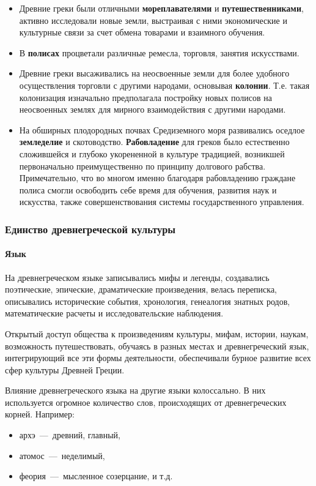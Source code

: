 \begin{itemize}
    \item Древние греки были отличными \textbf{мореплавателями} и \textbf{путешественниками}, активно исследовали новые земли, выстраивая с ними экономические и культурные связи за счет обмена товарами и взаимного обучения.
    \item В \textbf{полисах} процветали различные ремесла, торговля, занятия искусствами.
    \item Древние греки высаживались на неосвоенные земли для более удобного осуществления торговли с другими народами, основывая \textbf{колонии}. Т.е. такая колонизация изначально предполагала постройку новых полисов на неосвоенных землях для мирного взаимодействия с другими народами.
    \item На обширных плодородных почвах Средиземного моря развивались оседлое \textbf{земледелие} и скотоводство. \textbf{Рабовладение} для греков было естественно сложившейся и глубоко укорененной в культуре традицией, возникшей первоначально преимущественно по принципу долгового рабства. Примечательно, что во многом именно благодаря рабовладению граждане полиса смогли освободить себе время для обучения, развития наук и искусства, также совершенствования системы государственного управления.
\end{itemize}

\subsubsection{Единство древнегреческой культуры}

\paragraph{Язык}
На древнегреческом языке записывались мифы и легенды, создавались поэтические, эпические, драматические произведения, велась переписка, описывались исторические события, хронология, генеалогия знатных родов, математические расчеты и исследовательские наблюдения.

Открытый доступ общества к произведениям культуры, мифам, истории, наукам, возможность путешествовать, обучаясь в разных местах и древнегреческий язык, интегрирующий все эти формы деятельности, обеспечивали бурное развитие всех сфер культуры Древней Греции. 

Влияние древнегреческого языка на другие языки колоссально. В них используется огромное количество слов, происходящих от древнегреческих корней.
Например:
\begin{itemize}
    \item архэ~---~древний, главный,
    \item атомос~---~неделимый,
    \item феория~---~мысленное созерцание, и т.д.
\end{itemize}

